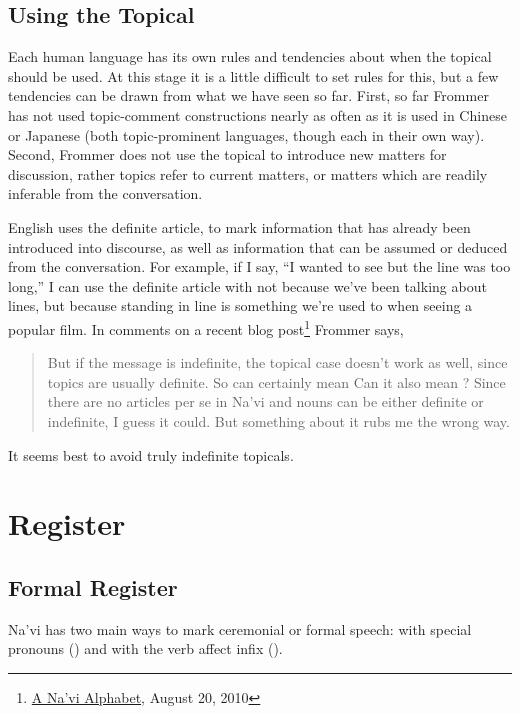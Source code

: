 \subsection{Using the Topical}
Each human language has its own rules and tendencies about when the
topical should be used.  At this stage it is a little difficult to set
rules for this, but a few tendencies can be drawn from what we have
seen so far.  First, so far Frommer has not used topic-comment
constructions nearly as often as it is used in Chinese or Japanese
(both topic-prominent languages, though each in their own way).
Second, Frommer does not use the topical to introduce new matters for
discussion, rather topics refer to current matters, or matters which
are readily inferable from the conversation.

English uses the definite article,  to mark information that
has already been introduced into discourse, as well as information
that can be assumed or deduced from the conversation.  For example, if
I say, ``I wanted to see  but the line was too long,'' I
can use the definite article with  not because we've been
talking about lines, but because standing in line is something we're
used to when seeing a popular film.  In comments on a recent blog
post\footnote{\href{https://naviteri.org/2010/08/20/}{A
Na'vi Alphabet}, August 20, 2010} Frommer says, 

\begin{quote}But if the message is indefinite, the topical case
doesn’t work as well, since topics are usually definite. So
 can certainly mean  Can it also mean ? Since there are no articles per se in Na’vi
and nouns can be either definite or indefinite, I guess it
could. But something about it rubs me the wrong way.
\end{quote}

\noindent It seems best to avoid truly indefinite topicals.


\section{Register}

\subsection{Formal Register} Na'vi has two main ways to mark
ceremonial or formal speech: with special pronouns
() and with the verb affect infix
 ().

